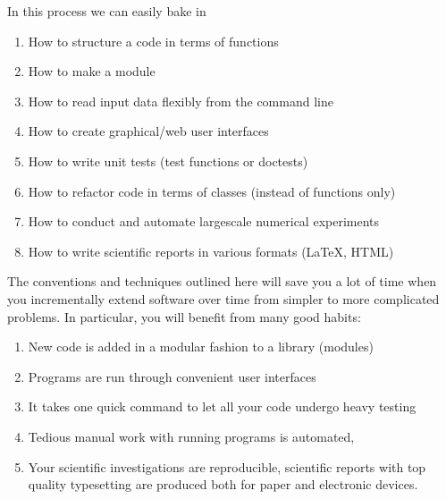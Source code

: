 \documentclass[letterpaper,10pt,english]{sphinxmanual}
\begin{document}
In this process we can easily bake in
\begin{enumerate}
%
\item {} 
How to structure a code in terms of functions

\item {} 
How to make a module

\item {} 
How to read input data flexibly from the command line

\item {} 
How to create graphical/web user interfaces

\item {} 
How to write unit tests (test functions or doctests)

\item {} 
How to refactor code in terms of classes (instead of functions only)

\item {} 
How to conduct and automate large\sphinxhyphen{}scale numerical experiments

\item {} 
How to write scientific reports in various formats (LaTeX, HTML)

\end{enumerate}

The conventions and techniques outlined here will save you a lot of time when you incrementally extend software over time from simpler to more complicated problems. In particular, you will benefit from many good habits:
\begin{enumerate}
%
\item {} 
New code is added in a modular fashion to a library (modules)

\item {} 
Programs are run through convenient user interfaces

\item {} 
It takes one quick command to let all your code undergo heavy testing

\item {} 
Tedious manual work with running programs is automated,

\item {} 
Your scientific investigations are reproducible, scientific reports with top quality typesetting are produced both for paper and electronic devices.

\end{enumerate}
\end{document}

